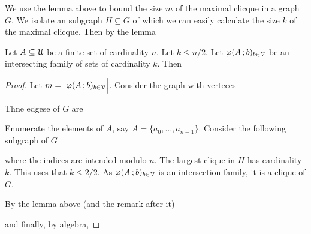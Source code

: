 \documentclass[scombinatorics.tex]{subfiles}
\begin{document}
We use the lemma above to bound the size $m$ of the maximal clicque in a graph $G$.
We isolate an subgraph $H\subseteq G$ of which we can easily calculate the size $k$ of the maximal clicque.
Then by the lemma 


\begin{void_thm}
   Let $A\subseteq\EuScript U$ be a finite set of cardinality $n$. 
   Let $k\le n/2$.
   Let $\varphi(A\,;b)_{b\in\EuScript V}$ be an intersecting family of sets of cardinality $k$.
   Then 
   
\end{void_thm}
   
\begin{proof}
   Let $m=\Big|\varphi(A\,;b)_{b\in\EuScript V}\Big|$.
   Consider the graph with verteces
   

   Thne edgese of $G$ are   


   Enumerate the elements of $A$, say $A=\{a_0,\dots,a_{n-1}\}$.
   Consider the following subgraph of $G$ 
   

   where the indices are intended modulo $n$.
   The largest clique in $H$ has cardinality $k$.
   This uses that $k\le 2/2$.
   As $\varphi(A\,;b)_{b\in\EuScript V}$ is an intersection family, it is a clique of $G$.
   
   By the lemma above (and the remark after it)


   and finally, by algebra,
  
\end{proof}
\end{document}
